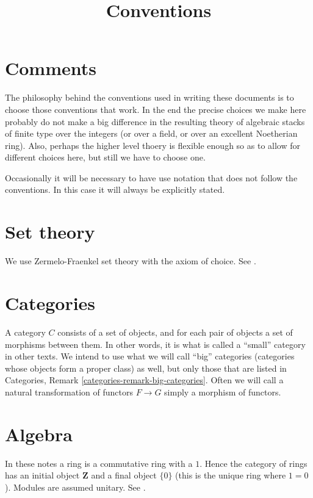 

%


\title{Conventions}


\maketitle

\tableofcontents

\section{Comments}
\label{section-comments}

\noindent
The philosophy behind the conventions used in writing these documents is
to choose those conventions that work. In the end the precise choices we 
make here probably do not make a big difference in the resulting theory 
of algebraic stacks of finite type over the integers (or over a field, 
or over an excellent Noetherian ring). Also, perhaps the higher level
thoery is flexible enough so as to allow for different choices here, but
still we have to choose one.

\smallskip\noindent
Occasionally it will be necessary to have use notation that does not follow 
the conventions. In this case it will always be explicitly stated.

\section{Set theory} 
\label{section-sets}

\noindent
We use Zermelo-Fraenkel set theory with the axiom of choice.
See \cite{Kunen}.

\section{Categories} 
\label{section-categories}

\noindent
A category $C$ consists of a set of objects, and for each pair of objects
a set of morphisms between them. In other words, it is what is called
a ``small'' category in other texts. We intend to use what we will
call ``big'' categories (categories whose objects form a proper class)
as well, but only those that are listed in Categories,
Remark \ref{categories-remark-big-categories}. Often we will
call a natural transformation of functors $F \to G$ simply a morphism of
functors.

\section{Algebra}
\label{section-algebra}

\noindent
In these notes a ring is a commutative ring with a $1$. Hence the
category of rings has an initial object $\mathbf{Z}$ and a final
object $\{0\}$ (this is the unique ring where $1=0$). Modules are 
assumed unitary. See \cite{E}.







